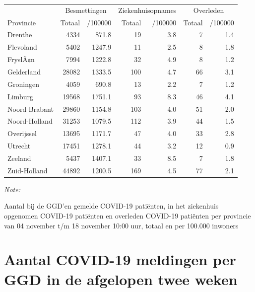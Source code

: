 \documentclass[
  english,
  man,floatsintext]{apa6}
\begin{document}
\begin{table}
\centering
\begin{threeparttable}
\begin{tabular}{lrrrrrr}
\toprule
\multicolumn{1}{c}{ } & \multicolumn{2}{c}{Besmettingen} & \multicolumn{2}{c}{Ziekenhuisopnames} & \multicolumn{2}{c}{Overleden} \\
\cmidrule(l{3pt}r{3pt}){2-3} \cmidrule(l{3pt}r{3pt}){4-5} \cmidrule(l{3pt}r{3pt}){6-7}
Provincie & Totaal & /100000 & Totaal & /100000 & Totaal & /100000\\
\midrule
Drenthe & 4334 & 871.8 & 19 & 3.8 & 7 & 1.4\\
Flevoland & 5402 & 1247.9 & 11 & 2.5 & 8 & 1.8\\
FryslÃ¢n & 7994 & 1222.8 & 32 & 4.9 & 8 & 1.2\\
Gelderland & 28082 & 1333.5 & 100 & 4.7 & 66 & 3.1\\
Groningen & 4059 & 690.8 & 13 & 2.2 & 7 & 1.2\\
Limburg & 19568 & 1751.1 & 93 & 8.3 & 46 & 4.1\\
Noord-Brabant & 29860 & 1154.8 & 103 & 4.0 & 51 & 2.0\\
Noord-Holland & 31253 & 1079.5 & 112 & 3.9 & 44 & 1.5\\
Overijssel & 13695 & 1171.7 & 47 & 4.0 & 33 & 2.8\\
Utrecht & 17451 & 1278.1 & 44 & 3.2 & 12 & 0.9\\
Zeeland & 5437 & 1407.1 & 33 & 8.5 & 7 & 1.8\\
Zuid-Holland & 44892 & 1200.5 & 169 & 4.5 & 77 & 2.1\\
\bottomrule
\end{tabular}
\begin{tablenotes}
\item \textit{Note: } 
\item Aantal bij de GGD’en gemelde COVID-19 patiënten, in het ziekenhuis opgenomen COVID-19 patiënten en overleden COVID-19 patiënten per provincie van 04 november t/m 18 november 10:00 uur, totaal en per 100.000 inwoners
\end{tablenotes}
\end{threeparttable}
\end{table}

\newpage

\hypertarget{aantal-covid-19-meldingen-per-ggd-in-de-afgelopen-twee-weken}{%
\section{Aantal COVID-19 meldingen per GGD in de afgelopen twee weken}\label{aantal-covid-19-meldingen-per-ggd-in-de-afgelopen-twee-weken}}
\end{document}
